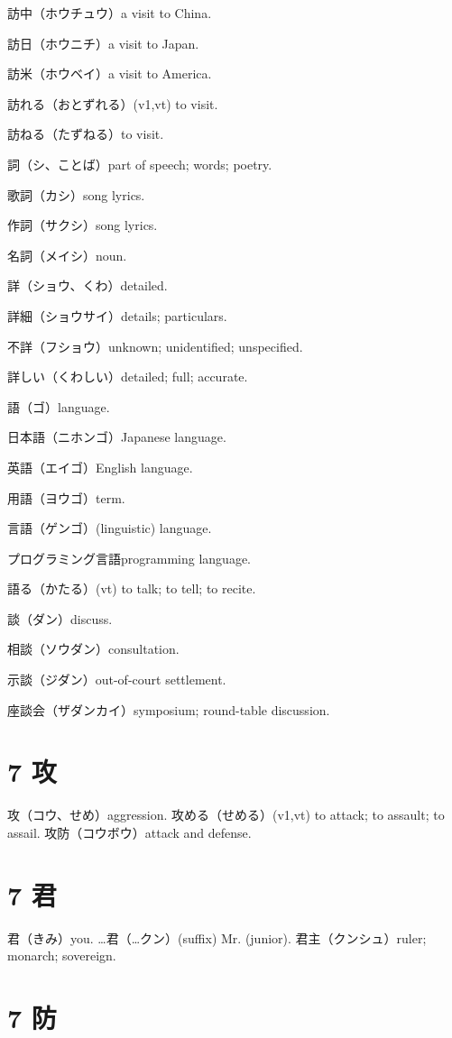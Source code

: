 訪中（ホウチュウ）a visit to China.

訪日（ホウニチ）a visit to Japan.

訪米（ホウベイ）a visit to America.

訪れる（おとずれる）(v1,vt) to visit.

訪ねる（たずねる）to visit.

詞（シ、ことば）part of speech; words; poetry.

歌詞（カシ）song lyrics.

作詞（サクシ）song lyrics.

名詞（メイシ）noun.

詳（ショウ、くわ）detailed.

詳細（ショウサイ）details; particulars.

不詳（フショウ）unknown; unidentified; unspecified.

詳しい（くわしい）detailed; full; accurate.

語（ゴ）language.

日本語（ニホンゴ）Japanese language.

英語（エイゴ）English language.

用語（ヨウゴ）term.

言語（ゲンゴ）(linguistic) language.

プログラミング言語programming language.

語る（かたる）(vt) to talk; to tell; to recite.

談（ダン）discuss.

相談（ソウダン）consultation.

示談（ジダン）out-of-court settlement.

座談会（ザダンカイ）symposium; round-table discussion.

\section{7 攻}

攻（コウ、せめ）aggression.
攻める（せめる）(v1,vt) to attack; to assault; to assail.
攻防（コウボウ）attack and defense.

\section{7 君}

君（きみ）you.
…君（…クン）(suffix) Mr. (junior).
君主（クンシュ）ruler; monarch; sovereign.

\section{7 防}

